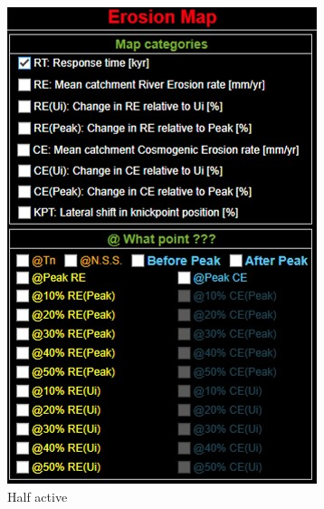 \documentclass[11pt,a4paper,titlepage]{report}
\begin{document}
\begin{figure}[H]
\begin{subfigure}[H]{0.3\textwidth}
    \end{subfigure}
    \quad
    \begin{subfigure}[H]{0.3\textwidth}
        \includegraphics[width=\textwidth]{mcwp2.jpg}
        \caption{Half active}
    \end{subfigure}
    \quad
    \begin{subfigure}[H]{0.3\textwidth}

\end{subfigure}
\end{figure}
\end{document}
